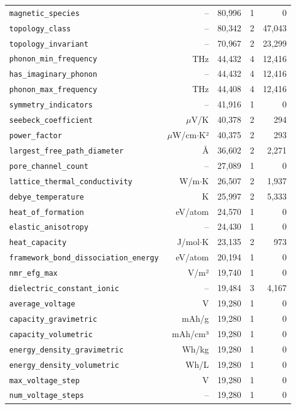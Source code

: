 \begin{longtable}{lrrrr}
\texttt{magnetic\_species} & -- & 80{,}996 & 1 & 0 \\
\texttt{topology\_class} & -- & 80{,}342 & 2 & 47{,}043 \\
\texttt{topology\_invariant} & -- & 70{,}967 & 2 & 23{,}299 \\
\texttt{phonon\_min\_frequency} & THz & 44{,}432 & 4 & 12{,}416 \\
\texttt{has\_imaginary\_phonon} & -- & 44{,}432 & 4 & 12{,}416 \\
\texttt{phonon\_max\_frequency} & THz & 44{,}408 & 4 & 12{,}416 \\
\texttt{symmetry\_indicators} & -- & 41{,}916 & 1 & 0 \\
\texttt{seebeck\_coefficient} & $\mu$V/K & 40{,}378 & 2 & 294 \\
\texttt{power\_factor} & $\mu$W/cm$\cdot$K² & 40{,}375 & 2 & 293 \\
\texttt{largest\_free\_path\_diameter} & Å & 36{,}602 & 2 & 2{,}271 \\
\texttt{pore\_channel\_count} & -- & 27{,}089 & 1 & 0 \\
\texttt{lattice\_thermal\_conductivity} & W/m$\cdot$K & 26{,}507 & 2 & 1{,}937 \\
\texttt{debye\_temperature} & K & 25{,}997 & 2 & 5{,}333 \\
\texttt{heat\_of\_formation} & eV/atom & 24{,}570 & 1 & 0 \\
\texttt{elastic\_anisotropy} & -- & 24{,}430 & 1 & 0 \\
\texttt{heat\_capacity} & J/mol$\cdot$K & 23{,}135 & 2 & 973 \\
\texttt{framework\_bond\_dissociation\_energy} & eV/atom & 20{,}194 & 1 & 0 \\
\texttt{nmr\_efg\_max} & V/m² & 19{,}740 & 1 & 0 \\
\texttt{dielectric\_constant\_ionic} & -- & 19{,}484 & 3 & 4{,}167 \\
\texttt{average\_voltage} & V & 19{,}280 & 1 & 0 \\
\texttt{capacity\_gravimetric} & mAh/g & 19{,}280 & 1 & 0 \\
\texttt{capacity\_volumetric} & mAh/cm³ & 19{,}280 & 1 & 0 \\
\texttt{energy\_density\_gravimetric} & Wh/kg & 19{,}280 & 1 & 0 \\
\texttt{energy\_density\_volumetric} & Wh/L & 19{,}280 & 1 & 0 \\
\texttt{max\_voltage\_step} & V & 19{,}280 & 1 & 0 \\
\texttt{num\_voltage\_steps} & -- & 19{,}280 & 1 & 0 \\

\end{longtable}
